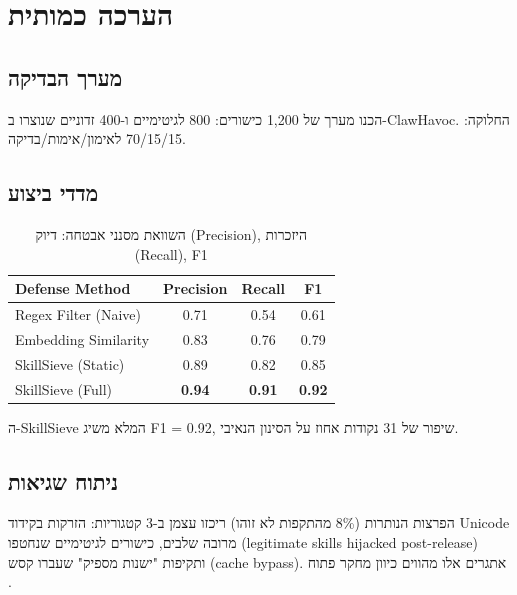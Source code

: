 
\clearpage
\chapter{הערכה כמותית}

\section{מערך הבדיקה}

הכנו מערך של \textenglish{1,200} כישורים: \textenglish{800} לגיטימיים ו-\textenglish{400} זדוניים שנוצרו ב-\textenglish{ClawHavoc}. החלוקה: \textenglish{70/15/15} לאימון/אימות/בדיקה.

\section{מדדי ביצוע}

\begin{table}[H]
\centering
\caption{השוואת מסנני אבטחה: דיוק (\textenglish{Precision}), היזכרות (\textenglish{Recall}), \textenglish{F1}}
\label{tab:security}
\begin{english}
\begin{tabular}{lccc}
\toprule
\textbf{Defense Method} & \textbf{Precision} & \textbf{Recall} & \textbf{F1} \\
\midrule
Regex Filter (Naive)  & 0.71 & 0.54 & 0.61 \\
Embedding Similarity  & 0.83 & 0.76 & 0.79 \\
SkillSieve (Static)   & 0.89 & 0.82 & 0.85 \\
SkillSieve (Full)     & \textbf{0.94} & \textbf{0.91} & \textbf{0.92} \\
\bottomrule
\end{tabular}
\end{english}
\end{table}

ה-\textenglish{SkillSieve} המלא משיג \textenglish{F1 = 0.92}, שיפור של \textenglish{31} נקודות אחוז על הסינון הנאיבי.

\section{ניתוח שגיאות}

הפרצות הנותרות (\textenglish{8\%} מהתקפות לא זוהו) ריכזו עצמן ב-\textenglish{3} קטגוריות: הזרקות בקידוד \textenglish{Unicode} מרובה שלבים, כישורים לגיטימיים שנחטפו (\textenglish{legitimate skills hijacked post-release}) ותקיפות "ישנות מספיק" שעברו קסש (\textenglish{cache bypass}). אתגרים אלו מהווים כיוון מחקר פתוח \cite{greshake2023indirect}.
